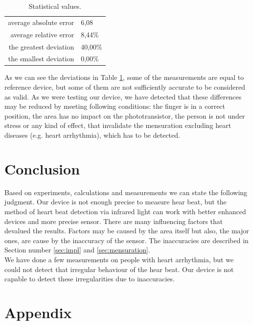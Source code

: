\documentclass[11pt,a4paper]{article}
\begin{document}
\begin{table}[H]
  \begin{center}
    \begin{tabular}{r|l}
      average absolute error & 6,08\\
      average relative error & 8,44\%\\
      the greatest deviation & 40,00\%\\
      the smallest deviation & 0,00\%\\
    \end{tabular}
    \caption{Statistical values.}
    \label{tab:stats}
  \end{center}
\end{table}

As we can see the deviations in Table \ref{tab:stats}, some of the measurements are equal to reference device, but some of them are not sufficiently accurate to be considered as valid. As we were testing our device, we have detected that these differences may be reduced by meeting following conditions: the finger is in a correct position, the area has no impact on the phototransistor, the person is not under stress or any kind of effect, that invalidate the mensuration excluding heart diseases (e.g. heart arrhythmia), which has to be detected.

\section{Conclusion}
Based on experiments, calculations and measurements we can state the following judgment. Our device is not enough precise to measure hear beat, but the method of heart beat detection via infrared light can work with better enhanced devices and more precise sensor. There are many influencing factors that devalued the results. Factors may be caused by the area itself but also, the major ones, are cause by the inaccuracy of the sensor. The inaccuracies are described in Section number \ref{sec:impl} and \ref{sec:mensuration}.\\

We have done a few measurements on people with heart arrhythmia, but we could not detect that irregular behaviour of the hear beat. Our device is not capable to detect these irregularities due to inaccuracies.

\newpage

\section{Appendix}
\end{document}
